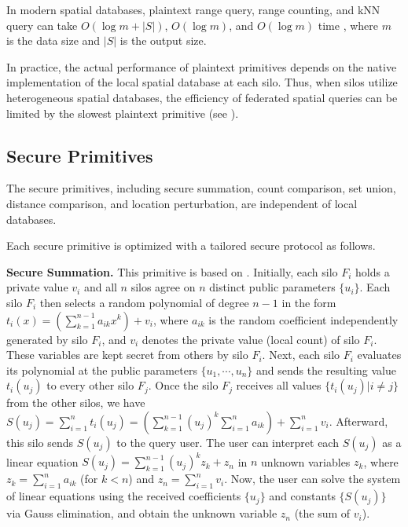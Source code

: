 In modern spatial databases, plaintext range query, range counting, and kNN query can take $O(\log{m}+|S|)$, $O(\log{m})$, and $O(\log{m})$ time \cite{DBLP:series/synthesis/2011Mamoulis},
where $m$ is the data size and $|S|$ is the output size.

In practice, the actual performance of plaintext primitives depends on the native implementation of the local spatial database at each silo.
Thus, when silos utilize heterogeneous spatial databases, the efficiency of federated spatial queries can be limited by the slowest plaintext primitive (see ). 

\subsection{Secure Primitives}
\label{sec:secure-primitives}

The secure primitives, including secure summation, count comparison, set union, distance comparison, and location perturbation, are independent of local databases.

Each secure primitive is optimized with a tailored secure protocol as follows.

\textbf{Secure Summation.} 
This primitive is based on \cite{DBLP:journals/dke/EmekciSAA07}.
Initially, each silo $F_i$ holds a private value $v_i$ and all $n$ silos agree on $n$ distinct public parameters $\{u_i\}$.
Each silo $F_i$ then selects a random polynomial of degree $n-1$ in the form $t_i(x)=(\sum_{k=1}^{n-1}a_{ik}x^k) + v_i$,
where $a_{ik}$ is the random coefficient independently generated by silo $F_i$, and $v_i$ denotes the private value (\ie local count) of silo $F_i$.
These variables are kept secret from others by silo $F_i$.
Next, each silo $F_i$ evaluates its polynomial at the public parameters $\{u_1, \cdots, u_n\}$ and sends the resulting value $t_i(u_j)$ to every other silo $F_j$.
Once the silo $F_j$ receives all values $\{t_i(u_j) | i \neq j\}$ from the other silos, we have 
$S(u_j) = \sum_{i=1}^{n}t_i(u_j)=(\sum_{k=1}^{n-1}(u_j)^k\sum_{i=1}^{n}a_{ik}) + \sum_{i=1}^{n}v_i$.
Afterward, this silo sends $S(u_j)$ to the query user.
The user can interpret each $S(u_j)$ as a linear equation $S(u_j)=\sum_{k=1}^{n-1}(u_j)^k z_k + z_n$ in $n$ unknown variables $z_k$,
where $z_k=\sum_{i=1}^n a_{ik}$ (for $k < n$) and $z_n=\sum_{i=1}^n v_i$.
Now, the user can solve the system of linear equations using the received coefficients $\{u_j\}$ and constants $\{S(u_j)\}$ via Gauss elimination, and obtain the unknown variable $z_n$ (\ie the sum of $v_i$).


